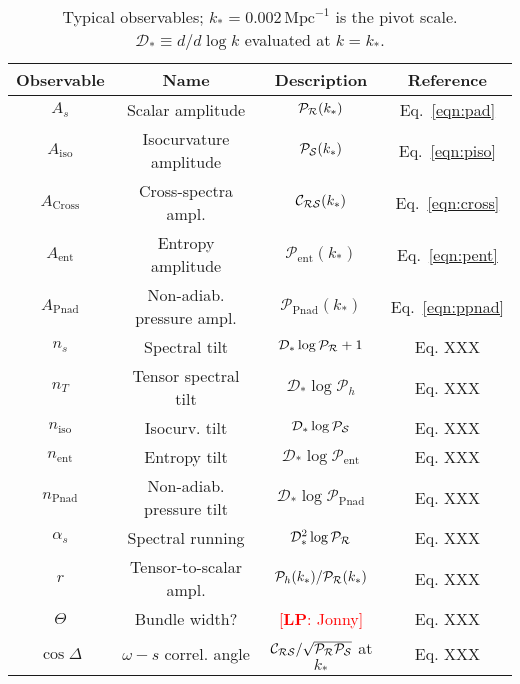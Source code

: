 \documentclass[11pt]{article}
\def\calR{{\cal R}}
\def\calS{{\cal S}}
\def\Pten{{\mathcal P_h}}
\def\Pent{{\mathcal P_\mathrm{ent}}}
\def\Ppnad{{\mathcal P_\mathrm{Pnad}}}
\def\Cross{{\mathcal C_\mathrm{\calR \calS}}}
\def\PR{{\mathcal P_\calR}}
\def\PS{{\mathcal P_\calS}}
\newcommand{\lp}[1]{\textcolor{red}{[{\bf LP}: #1]}}
\begin{document}
\begin{table}
  \centering
  \begin{tabular}{  c  c c  c }
    \hline
    Observable &  Name & Description & Reference \\
    \hline
    $A_s$ \dotfill             &   Scalar amplitude & $\PR(k_*)$  & Eq.~\eqref{eqn:pad}  \\
    $A_\mathrm{iso}$  \dotfill &   Isocurvature amplitude & $\PS(k_*)$ & Eq.~\eqref{eqn:piso}  \\
   $A_\mathrm{Cross}$ \dotfill &   Cross-spectra ampl.& $\Cross(k_*)$ & Eq.~\eqref{eqn:cross}  \\
    $A_\mathrm{ent}$  \dotfill &   Entropy amplitude& $\Pent(k_*)$ & Eq.~\eqref{eqn:pent}  \\
    $A_\mathrm{Pnad}$ \dotfill &   Non-adiab. pressure ampl.& $\Ppnad(k_*)$ & Eq.~\eqref{eqn:ppnad}  \\
    \hline

    $n_s$  \dotfill            &    Spectral tilt & $\mathcal D_* \log \PR+1$& Eq. XXX  \\
    $n_T$  \dotfill            &    Tensor spectral tilt & $\mathcal D_* \log \Pten$& Eq. XXX  \\
    $n_\mathrm{iso}$  \dotfill &    Isocurv. tilt & $\mathcal D_* \log \PS$& Eq. XXX  \\
    $n_\mathrm{ent}$  \dotfill &    Entropy tilt & $\mathcal D_* \log \Pent$& Eq. XXX \\
    $n_\mathrm{Pnad}$ \dotfill &    Non-adiab. pressure tilt & $\mathcal D_* \log \Ppnad$& Eq. XXX  \\
    \hline

    $\alpha_s$  \dotfill     &  Spectral running & $\mathcal D_*^2 \log \PR$ & Eq. XXX  \\
    $r$    \dotfill          &  Tensor-to-scalar ampl. & $\Pten(k_*)/\PR(k_*)$ & Eq. XXX  \\
    $\Theta$ \dotfill            &  Bundle width?  & \lp{Jonny}  & Eq. XXX  \\
    $\cos \Delta$ \dotfill            &  $\omega-s$ correl. angle & $\Cross/\sqrt{\mathcal P_{\mathcal R} \mathcal P_{\mathcal S}}$ at $k_*$   & Eq. XXX  \\
    \hline
  \end{tabular}

  \caption{Typical observables; $k_*=0.002 \, \mathrm{Mpc}^{-1}$ is the pivot scale.    $\mathcal D_* \equiv d/d \log k$ evaluated at $k=k_*$.}
  \label{table:observables}
\end{table}
\end{document}
